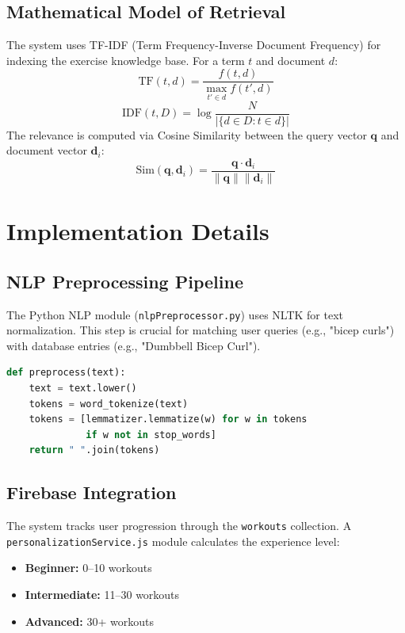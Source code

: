 \documentclass[conference]{IEEEtran}
\begin{document}
\subsection{Mathematical Model of Retrieval}
The system uses TF-IDF (Term Frequency-Inverse Document Frequency) for indexing the exercise knowledge base. For a term $t$ and document $d$:
\begin{equation}
\text{TF}(t, d) = \frac{f(t, d)}{\max_{t' \in d} f(t', d)}
\end{equation}
\begin{equation}
\text{IDF}(t, D) = \log \frac{N}{|\{d \in D : t \in d\}|}
\end{equation}
The relevance is computed via Cosine Similarity between the query vector $\mathbf{q}$ and document vector $\mathbf{d}_i$:
\begin{equation}
\text{Sim}(\mathbf{q}, \mathbf{d}_i) = \frac{\mathbf{q} \cdot \mathbf{d}_i}{\|\mathbf{q}\| \|\mathbf{d}_i\|}
\end{equation}

\section{Implementation Details}

\subsection{NLP Preprocessing Pipeline}
The Python NLP module (\texttt{nlpPreprocessor.py}) uses NLTK for text normalization. This step is crucial for matching user queries (e.g., "bicep curls") with database entries (e.g., "Dumbbell Bicep Curl").
\begin{lstlisting}[language=Python]
def preprocess(text):
    text = text.lower()
    tokens = word_tokenize(text)
    tokens = [lemmatizer.lemmatize(w) for w in tokens 
              if w not in stop_words]
    return " ".join(tokens)
\end{lstlisting}

\subsection{Firebase Integration}
The system tracks user progression through the \texttt{workouts} collection. A \texttt{personalizationService.js} module calculates the experience level:
\begin{itemize}
    \item \textbf{Beginner:} 0--10 workouts
    \item \textbf{Intermediate:} 11--30 workouts
    \item \textbf{Advanced:} 30+ workouts
\end{itemize}
\end{document}
